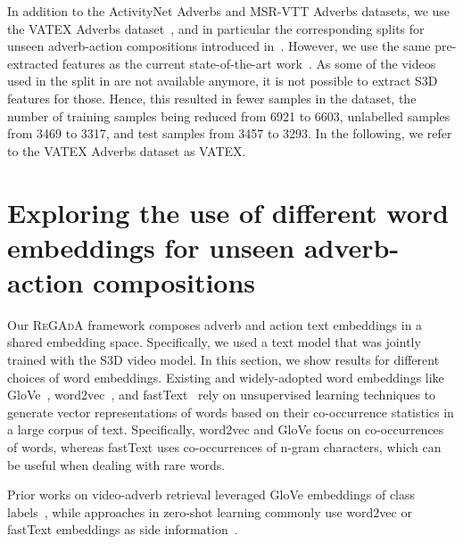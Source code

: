 \documentclass[table]{bmvc2k}
\newcommand{\modelName}{\textsc{ReGAdA}\xspace}
\begin{document}
In addition to the ActivityNet Adverbs and MSR-VTT Adverbs datasets, we use the VATEX Adverbs dataset~\cite{wang2019vatex,doughty_action_2020}, and in particular the corresponding splits for unseen adverb-action compositions introduced in~\cite{doughty_how_2022}. However, we use the same pre-extracted features as the current state-of-the-art work~\cite{moltisanti2023learning}. As some of the videos used in the split in \cite{doughty_how_2022} are not available anymore, it is not possible to extract S3D features for those. Hence, this resulted in fewer samples in the dataset, the number of training samples being reduced from 6921 to 6603, unlabelled samples from 3469 to 3317, and test samples from 3457 to 3293. In the following, we refer to the VATEX Adverbs dataset as VATEX.



\section{Exploring the use of different word embeddings for unseen adverb-action compositions}\label{supp:sec-unseen}


Our \modelName framework composes adverb and action text embeddings in a shared embedding space. Specifically, we used a text model that was jointly trained with the S3D video model.  In this section, we show results for different choices of word embeddings. Existing and widely-adopted word embeddings like GloVe~\cite{pennington2014glove}, word2vec~\cite{mikolov2013efficient}, and fastText~\cite{bojanowski2017fasttext} rely on unsupervised learning techniques to generate vector representations of words based on their co-occurrence statistics in a large corpus of text. Specifically, word2vec and GloVe focus on co-occurrences of words, whereas fastText uses co-occurrences of n-gram characters, which can be useful when dealing with rare words.

Prior works on video-adverb retrieval leveraged GloVe embeddings of class labels~\cite{doughty_action_2020,doughty_how_2022}, while approaches in zero-shot learning commonly use word2vec or fastText embeddings as side information~\cite{xian2016latent,mancini2021_compcos,naeem2021_cge,mercea2022avca,mercea2022tcaf}. 
\end{document}
